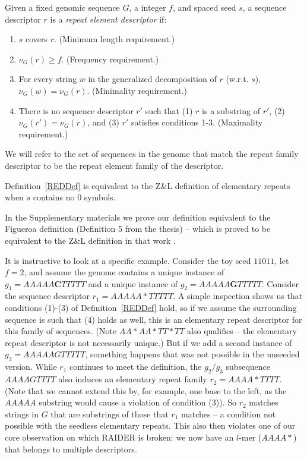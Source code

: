 \documentclass{bmcart}
\begin{document}
\begin{definition}
  \label{REDDef}
  Given a fixed genomic sequence $G$, a integer $f$, and spaced seed $s$, a sequence
  descriptor $r$ is a {\it repeat element descriptor} if:
  \begin{enumerate}
  \item $s$ covers $r$.  (Minimum length requirement.)
  \item $\nu_G(r) \geq f$.  (Frequency requirement.)
  \item For every string $w$ in the generalized decomposition of $r$
    (w.r.t. $s$), $\nu_G(w) = \nu_G(r)$.  (Minimality requirement.)
  \item There is no sequence descriptor $r'$ such that (1) $r$ is
    a substring of $r'$, (2) $\nu_G(r') = \nu_G(r)$, and (3) $r'$
    satisfies conditions 1-3.  (Maximality requirement.)
  \end{enumerate}
\end{definition}

We will refer to the set of sequences in the genome that match the
repeat family descriptor to be the repeat element family of the
descriptor.

\begin{theorem}
Definition~\ref{REDDef} is equivalent to the Z\&L
definition of elementary repeats when $s$ contains no 0 symbols.
\end{theorem}
In the Supplementary materials we prove our definition equivalent to
the Figueroa definition (Definition 5 from the thesis) -- which is
proved to be equivalent to the Z\&L definition in that work \cite{Figueroa:2014uk}.

It is instructive to look at a specific example.  Consider the toy
seed $11011$, let $f=2$, and assume the genome contains a unique
instance of $g_1 = AAAAA{\mathbf C}TTTTT$ and a unique instance of
$g_2 = AAAAA{\mathbf G}TTTTT$.  Consider the sequence descriptor $r_1
= AAAAA*TTTTT$.  A simple inspection shows us that conditions (1)-(3)
of Definition~\ref{REDDef} hold, so if we assume the surrounding
sequence is such that (4) holds as well, this is an elementary repeat
descriptor for this family of sequences.  (Note $AA*AA*TT*TT$ also qualifies -- the
elementary repeat descriptor is not necessarily unique.)  But if we add a second
instance of $g_3 = AAAAAGTTTTT$, something happens that was not
possible in the unseeded version.  While $r_1$ continues to meet the definition, the $g_2/g_3$
subsequence $AAAAGTTTT$ also induces an elementary repeat family
$r_2 = AAAA*TTTT$. (Note that we cannot extend this by, for example,
one base to the left, as the $AAAAA$ substring would cause a violation
of condition (3)).  So $r_2$ matches strings in $G$ that are
substrings of those that $r_1$ matches -- a condition not possible
with the seedless elementary repeats.  This also then violates one of
our core observation on which RAIDER is broken: we now have an $l$-mer
($AAAA*$) that belongs to multiple descriptors.
\end{document}
